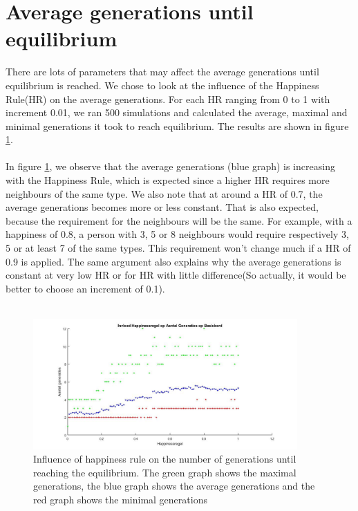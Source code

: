 
\section{Average generations until equilibrium}
There are lots of parameters that may affect the average generations until  equilibrium is reached. We chose to look at the influence of the Happiness Rule(HR) on the average generations. For each HR ranging from 0 to 1 with increment 0.01, we ran 500 simulations and calculated the average, maximal and minimal generations it took to reach equilibrium. The results are shown in figure \ref{fig:avegen}.\\
\\
In figure \ref{fig:avegen}, we observe that the average generations (blue graph) is increasing with the Happiness Rule, which is expected since a higher HR requires more neighbours of the same type. We also note that at around a HR of 0.7, the average generations becomes more or less constant. That is also expected, because the requirement for the neighbours will be the same. For example, with a happiness of 0.8, a person with 3, 5 or 8 neighbours would require respectively 3, 5 or at least 7 of the same types. This requirement won't change much if a HR of 0.9 is applied. The same argument also explains why the average generations is constant at very low HR or for HR with little difference(So actually, it would be better to choose an increment of 0.1).\\
\\
\begin{figure}[h!]
    \centering
    \includegraphics[width=0.9\textwidth]{happinessregel_aantgen_2}
    \caption{Influence of happiness rule on the number of generations until reaching the equilibrium. The green graph shows the maximal generations, the blue graph shows the average generations and the red graph shows the minimal generations}
    \label{fig:avegen}
\end{figure}
\\
